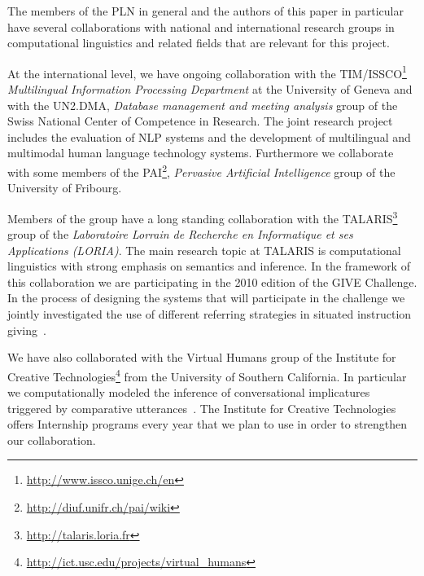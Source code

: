 The members of the PLN in general and the authors of this paper in particular
have several collaborations with national and international research groups in 
computational linguistics and related fields that are relevant for this project. 
 
At the international level, we have ongoing collaboration with the TIM/ISSCO\footnote{\url{http://www.issco.unige.ch/en}} \emph{Multilingual Information Processing Department} at the University of Geneva and with the
UN2.DMA, \emph{Database management
and meeting analysis} group of the Swiss National Center of Competence in Research. 
The joint research project includes the evaluation of NLP systems and the
development of multilingual and multimodal human language technology systems. 
Furthermore we
collaborate with some members of the PAI\footnote{\url{http://diuf.unifr.ch/pai/wiki}}, \textit{Pervasive Artificial Intelligence} group of the University of Fribourg. 

Members of the group have a long standing collaboration  with
the TALARIS\footnote{\url{http://talaris.loria.fr}}
group of the \emph{Laboratoire Lorrain de Recherche en Informatique et ses
Applications (LORIA)}. The main research topic at TALARIS is computational
linguistics
with strong emphasis on semantics and inference. In the framework of this
collaboration we are participating in the 2010 edition of the GIVE
Challenge. In the process of designing the systems that will participate in
the challenge we jointly investigated the use of different referring strategies
in situated instruction
giving~\cite{amoia10}. 

We have also collaborated with the Virtual Humans group of the Institute for
Creative Technologies\footnote{\url{http://ict.usc.edu/projects/virtual_humans}}
from the University of Southern California. In particular we computationally
modeled the inference of conversational implicatures triggered by comparative
utterances~\cite{benotti09a}. The Institute for Creative Technologies offers
Internship programs every year that we plan to use in order to strengthen our
collaboration.

